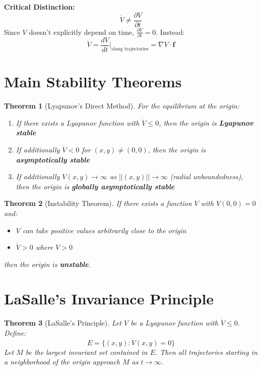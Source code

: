 \documentclass[12pt]{article}
\newtheorem{theorem}{Theorem}
\begin{document}
\begin{warning}
\textbf{Critical Distinction:}
$$\dot{V} \neq \frac{\partial V}{\partial t}$$
Since $V$ doesn't explicitly depend on time, $\frac{\partial V}{\partial t} = 0$. Instead:
$$\dot{V} = \frac{dV}{dt}\bigg|_{\text{along trajectories}} = \nabla V \cdot \mathbf{f}$$
\end{warning}

\section{Main Stability Theorems}

\begin{theorem}[Lyapunov's Direct Method]
For the equilibrium at the origin:
\begin{enumerate}
    \item If there exists a Lyapunov function with $\dot{V} \leq 0$, then the origin is \textbf{Lyapunov stable}
    \item If additionally $\dot{V} < 0$ for $(x,y) \neq (0,0)$, then the origin is \textbf{asymptotically stable}
    \item If additionally $V(x,y) \to \infty$ as $||(x,y)|| \to \infty$ (radial unboundedness), then the origin is \textbf{globally asymptotically stable}
\end{enumerate}
\end{theorem}

\begin{theorem}[Instability Theorem]
If there exists a function $V$ with $V(0,0) = 0$ and:
\begin{itemize}
    \item $V$ can take positive values arbitrarily close to the origin
    \item $\dot{V} > 0$ where $V > 0$
\end{itemize}
then the origin is \textbf{unstable}.
\end{theorem}

\section{LaSalle's Invariance Principle}

\begin{theorem}[LaSalle's Principle]
Let $V$ be a Lyapunov function with $\dot{V} \leq 0$. Define:
$$E = \{(x,y) : \dot{V}(x,y) = 0\}$$
Let $M$ be the largest invariant set contained in $E$. Then all trajectories starting in a neighborhood of the origin approach $M$ as $t \to \infty$.
\end{theorem}
\end{document}
